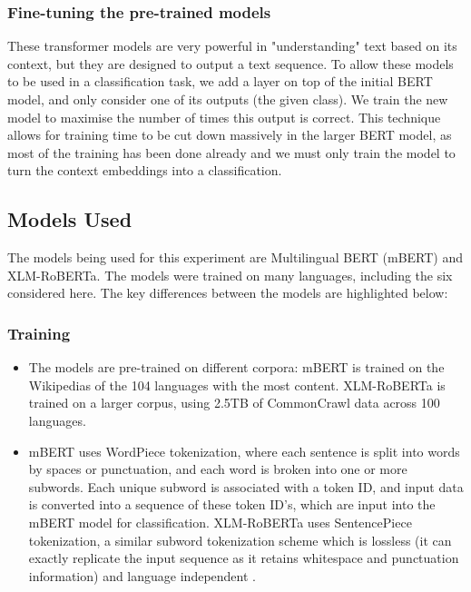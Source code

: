 \documentclass{l4proj}
\begin{document}
\subsubsection{Fine-tuning the pre-trained models}
These transformer models are very powerful in "understanding" text based on its context, but they are designed to output a text sequence. To allow these models to be used in a classification task, we add a layer on top of the initial BERT model, and only consider one of its outputs (the given class). We train the new model to maximise the number of times this output is correct. This technique allows for training time to be cut down massively in the larger BERT model, as most of the training has been done already and we must only train the model to turn the context embeddings into a classification.


\subsection{Models Used}
\par
The models being used for this experiment are Multilingual BERT (mBERT) and XLM-RoBERTa. The models were trained on many languages, including the six considered here. The key differences between the models are highlighted below:
\subsubsection{Training} \hfill \par
\begin{itemize}
    \item The models are pre-trained on different corpora: mBERT is trained on the Wikipedias of the 104 languages with the most content. XLM-RoBERTa is trained on a larger corpus, using 2.5TB of CommonCrawl data across 100 languages. 
    \item mBERT uses WordPiece tokenization, where each sentence is split into words by spaces or punctuation, and each word is broken into one or more subwords. Each unique subword is associated with a token ID, and input data is converted into a sequence of these token ID's, which are input into the mBERT model for classification. XLM-RoBERTa uses SentencePiece tokenization, a similar subword tokenization scheme which is lossless (it can exactly replicate the input sequence as it retains whitespace and punctuation information) and language independent \citep{kudo2018sentencepiece}. 
\end{itemize}
 
\end{document}
